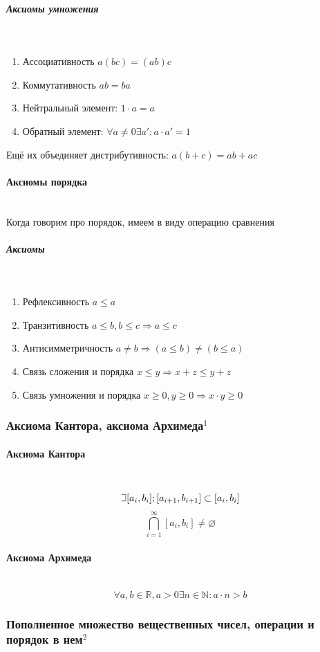 \documentclass{article}
\def\letus{%
\mathord{\setbox0=\hbox{$\exists$}%
         \hbox{\kern 0.125\wd0%
               \vbox to \ht0{%
                  \hrule width 0.75\wd0%
                  \vfill%
                  \hrule width 0.75\wd0}%
               \vrule height \ht0%
               \kern 0.125\wd0}%
       }%
        }
\let\vanillaparagraph\paragraph
\let\vanillasubparagraph\subparagraph
\renewcommand{\paragraph}[1]{\vanillaparagraph{#1}\mbox{}\\}
\renewcommand{\subparagraph}[1]{\vanillasubparagraph{#1}\mbox{}\\}
\begin{document}
\subparagraph{Аксиомы умножения}
\begin{enumerate}
    \item Ассоциативность $a(bc) = (ab)c$
    \item Коммутативность $ab = ba$
    \item Нейтральный элемент: $1 \cdot a = a$
    \item Обратный элемент: $\forall a \ne 0 \exists a' : a\cdot a' = 1$
\end{enumerate}

Ещё их объединяет дистрибутивность: $a(b+c) = ab + ac$

\paragraph{Аксиомы порядка}
Когда говорим про порядок, имеем в виду операцию сравнения
\subparagraph{Аксиомы}
\begin{enumerate}
    \item Рефлексивность $a \le a$
    \item Транзитивность $a \le b, b \le c \Rightarrow a \le c$
    \item Антисимметричность $a \ne b \Rightarrow (a \le b) \ne (b \le a)$
    \item Связь сложения и порядка $x \le y \Rightarrow x + z \le y + z$
    \item Связь умножения и порядка $x \ge 0, y \ge 0 \Rightarrow x \cdot y \ge 0$
\end{enumerate}

\subsubsection{Аксиома Кантора, аксиома Архимеда\texorpdfstring{$^1$}{}}
\paragraph{Аксиома Кантора}
$$\letus [a_i, b_i]; [a_{i+1}, b_{i+1}] \subset [a_i, b_i]$$
$$
\bigcap_{i=1}^\infty [a_i, b_i] \ne \varnothing
$$

\paragraph{Аксиома Архимеда}
$$
\forall a, b \in \mathbb{R}, a > 0 \exists n \in \mathbb{N} : a\cdot n > b
$$

\subsubsection{Пополненное множество вещественных чисел, операции и порядок в нем\texorpdfstring{$^2$}{}}
\end{document}
